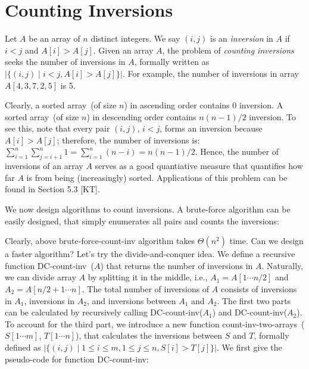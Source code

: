 \setcounter{definition}{0} \setcounter{property}{0} \setcounter{claim}{0} \setcounter{fact}{0} \setcounter{corollary}{0} \setcounter{figure}{0}

\section{Counting Inversions}

Let $A$ be an array of $n$ distinct integers.
We say $(i,j)$ is an \emph{inversion} in $A$ if $i < j$ and $A[i] > A[j]$.
Given an array $A$, the problem of \emph{counting inversions} seeks the
number of inversions in $A$, formally written as $|\{(i,j)\mid i<j, A[i]>A[j]\}|$.
For example, the number of inversions in array $A[4, 3, 7, 2, 5]$ is 5.

Clearly, a sorted array~(of size $n$) in ascending order contains 0 inversion.
A sorted array~(of size $n$) in descending order contains $n(n-1)/2$ inversion.
To see this, note that every pair $(i,j)$, $i<j$, forms an inversion because 
$A[i] > A[j]$; therefore, the number of inversions is: $\sum_{i=1}^n \sum_{j=i+1}^n 1 = \sum_{i=1}^n (n-i) = n(n-1)/2$.
Hence, the number of inversions of an array $A$ serves as a good quantiative measure
that quantifies how far $A$ is from being (increasingly) sorted.
Applications of this problem can be found in Section 5.3 [KT].

We now design algorithms to count inversions.
A brute-force algorithm can be easily designed, that simply
enumerates all pairs and counts the inversions:


\begin{algorithmblock}[0.8\textwidth]
	\xxx
	\xxx
	\xxx
	\xxx
	\xxx
	\xxx
\end{algorithmblock}

Clearly, above brute-force-count-inv algorithm takes $\Theta(n^2)$ time. Can we design a faster algorithm?
Let's try the divide-and-conquer idea. We define a recursive function DC-count-inv~($A$) that returns the number
of inversions in $A$.
Naturally, we can divide array $A$ by splitting it in the middle, i.e., $A_1 = A[1\cdots n/2]$
and $A_2 = A[n/2 + 1 \cdots n]$. The total number of inversions of $A$ consists of inversions in $A_1$, inversions
in $A_2$, and inversions between $A_1$ and $A_2$. The first two parts can be calculated by recursively
calling DC-count-inv($A_1$) and DC-count-inv($A_2$). To account for the third part,
we introduce a new function count-inv-two-arrays~($S[1\cdots m]$, $T[1\cdots n]$), that calculates the
inversions between $S$ and $T$, formally defined as $|\{(i,j)\mid 1\le i \le m, 1\le j \le n, S[i]> T[j]\}|$.
We first give the pseudo-code for function DC-count-inv:

